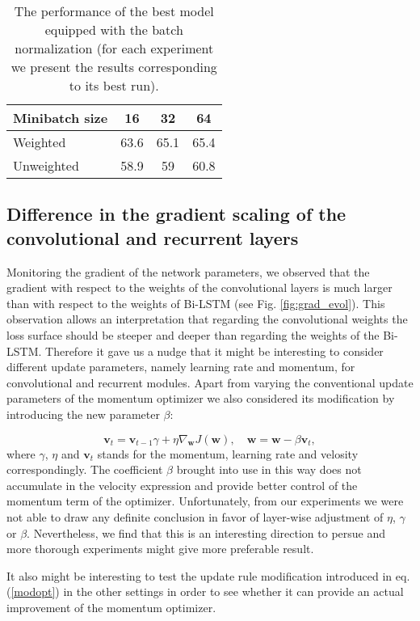 \documentclass[a4paper]{article}
\newcommand{\beq}{\begin{equation}}
\newcommand{\eeq}{\end{equation}}
\newcommand{\bs}{\boldsymbol}  \newcommand{\theHalgorithm}{\arabic{algorithm}}
\begin{document}
\begin{table}[!htb]
\caption{The performance of the best model equipped with the batch normalization (for each experiment we present the results corresponding to its best run).}
\label{table-batchnorm}
\centering
\begin{tabular}{lccc}
\toprule
Minibatch size & 16 & 32 & 64\\
\midrule
Weighted & 63.6 & 65.1 & 65.4\\
Unweighted & 58.9 & 59 & 60.8\\
\bottomrule
\end{tabular}
\end{table}


\subsection{Difference in the gradient scaling of the convolutional and recurrent layers}
\label{lwga}

Monitoring the gradient of the network parameters, we observed that the gradient with respect to the weights of the convolutional layers is much larger than with respect to the weights of Bi-LSTM (see Fig. \ref{fig:grad_evol}). This observation allows an interpretation that regarding the convolutional weights the loss surface should be steeper and deeper than regarding the weights of the Bi-LSTM. Therefore it gave us a nudge that it might be interesting to consider different update parameters, namely learning rate and momentum, for convolutional and recurrent modules. 
Apart from varying the conventional update parameters of the momentum optimizer we also considered its modification by introducing the new parameter $\beta$: 

\beq
\bs{v}_t = \bs{v}_{t-1}\gamma + \eta \nabla_{\bs{w}} J(\bs{w}), \quad
\bs{w} = \bs{w} - \beta \bs{v}_t,
\label{modopt}
\eeq
where $\gamma$, $\eta$ and $\bs{v}_t$ stands for the momentum, learning rate and velosity correspondingly. The coefficient $\beta$ brought into use in this way does not accumulate in the velocity expression and provide better control of the momentum term of the optimizer.  
Unfortunately, from our experiments we were not able to draw any definite conclusion in favor of layer-wise adjustment of $\eta$, $\gamma$ or $\beta$. Nevertheless, we find that this is an interesting direction to persue and more thorough experiments might give more preferable result. 

It also might be interesting to test the update rule modification introduced in eq. (\ref{modopt})
in the other settings in order to see whether it can provide an actual improvement of the momentum optimizer. 
\end{document}
